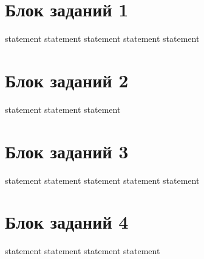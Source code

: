 \section{Блок заданий 1}

{statement}
{statement}
{statement}
{statement}
{statement}

\section{Блок заданий 2}

{statement}
{statement}
{statement}

\section{Блок заданий 3}

{statement}
{statement}
{statement}
{statement}
{statement}

\section{Блок заданий 4}

{statement}
{statement}
{statement}
{statement}